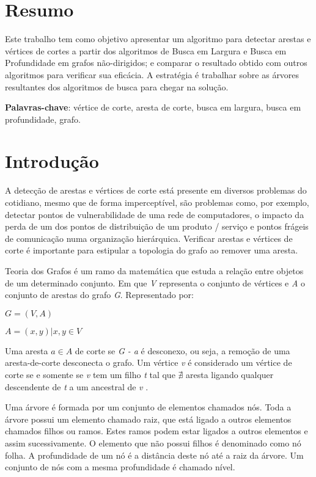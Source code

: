 \documentclass[
	article,
	12pt,
	openright,
	oneside,
	a4paper,
	english,
	french,
	spanish,
	brazil
	]{abntex2}
\begin{document}
\frenchspacing
\imprimircapa
\imprimirfolhaderosto

\section{Resumo}
Este trabalho tem como objetivo apresentar um algoritmo para detectar arestas e vértices de cortes  a partir dos algoritmos de Busca em Largura e Busca em Profundidade em grafos não-dirigidos; e comparar o resultado obtido com outros algoritmos para verificar sua eficácia. A estratégia é  trabalhar sobre as árvores resultantes dos algoritmos de busca para chegar na solução.


\textbf{Palavras-chave}: vértice de corte, aresta de corte, busca em largura, busca em profundidade, grafo.

\section{Introdução}
A detecção de arestas e vértices de corte está presente em diversos problemas do cotidiano, mesmo que de forma imperceptível, são problemas como, por exemplo, detectar pontos de vulnerabilidade de uma rede de computadores, o impacto da perda de um dos pontos de distribuição de um produto / serviço e pontos frágeis de comunicação numa organização hierárquica. Verificar arestas e vértices de corte é importante para estipular a topologia do grafo ao remover uma aresta.

Teoria dos Grafos é um ramo da matemática que estuda a relação entre objetos de um determinado conjunto. Em que \textit{V} representa o conjunto de vértices e \textit{A} o conjunto de arestas do grafo \textit{G}. Representado por:

$G=(V,A)$

$A={(x,y) | x, y \in V}$

Uma aresta $a \in A$ de corte se \textit{G - a} é desconexo, ou seja, a remoção de uma aresta-de-corte desconecta o grafo. Um vértice \textit{v} é  considerado um vértice de corte se e somente se \textit{v} tem um filho \textit{t} tal que \(\nexists\) aresta ligando qualquer descendente de \textit{t} a um ancestral de \textit{v} \cite{cormen}.

Uma árvore é formada por um conjunto de elementos chamados nós. Toda a árvore possui um elemento chamado raiz, que está ligado a outros elementos chamados filhos ou ramos. Estes ramos podem estar ligados a outros elementos e assim sucessivamente. O elemento que não possui filhos é denominado como nó folha. A profundidade de um nó é a distância deste nó até a raiz da árvore. Um conjunto de nós com a mesma profundidade é chamado nível.
\end{document}
